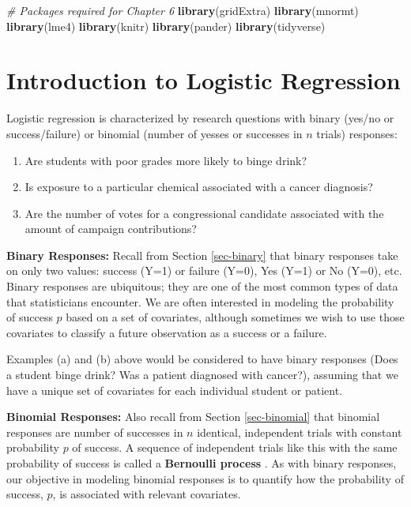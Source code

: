 \documentclass[
]{krantz}
\newenvironment{Shaded}{\begin{snugshade}}{\end{snugshade}}
\newcommand{\CommentTok}[1]{\textcolor[rgb]{0.37,0.37,0.37}{\textit{#1}}}
\newcommand{\KeywordTok}[1]{\textcolor[rgb]{0.27,0.27,0.27}{\textbf{#1}}}
\newcommand{\NormalTok}[1]{#1}
\providecommand{\tightlist}{%
  \setlength{\itemsep}{0pt}\setlength{\parskip}{0pt}}
\begin{document}
\begin{Shaded}
\begin{Highlighting}[]
\CommentTok{# Packages required for Chapter 6}
\KeywordTok{library}\NormalTok{(gridExtra)  }
\KeywordTok{library}\NormalTok{(mnormt) }
\KeywordTok{library}\NormalTok{(lme4) }
\KeywordTok{library}\NormalTok{(knitr) }
\KeywordTok{library}\NormalTok{(pander)}
\KeywordTok{library}\NormalTok{(tidyverse)}
\end{Highlighting}
\end{Shaded}

\hypertarget{introduction-to-logistic-regression}{%
\section{Introduction to Logistic Regression}\label{introduction-to-logistic-regression}}

Logistic regression is characterized by research questions with binary (yes/no or success/failure) or binomial (number of yesses or successes in \(n\) trials) responses:

\begin{enumerate}
\def\labelenumi{\alph{enumi}.}
\tightlist
\item
  Are students with poor grades more likely to binge drink?
\item
  Is exposure to a particular chemical associated with a cancer diagnosis?
\item
  Are the number of votes for a congressional candidate associated with the amount of campaign contributions?
\end{enumerate}

\textbf{Binary Responses:} Recall from Section \ref{sec-binary} that binary responses take on only two values: success (Y=1) or failure (Y=0), Yes (Y=1) or No (Y=0), etc. Binary responses are ubiquitous; they are one of the most common types of data that statisticians encounter. We are often interested in modeling the probability of success \(p\) based on a set of covariates, although sometimes we wish to use those covariates to classify a future observation as a success or a failure.

Examples (a) and (b) above would be considered to have binary responses (Does a student binge drink? Was a patient diagnosed with cancer?), assuming that we have a unique set of covariates for each individual student or patient.

\textbf{Binomial Responses:} Also recall from Section \ref{sec-binomial} that binomial responses are number of successes in \(n\) identical, independent trials with constant probability \(p\) of success. A sequence of independent trials like this with the same probability of success is called a \textbf{Bernoulli process} . As with binary responses, our objective in modeling binomial responses is to quantify how the probability of success, \(p\), is associated with relevant covariates.
\end{document}
